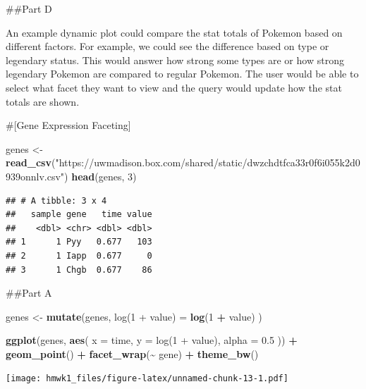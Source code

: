 \documentclass[
]{article}
\newenvironment{Shaded}{\begin{snugshade}}{\end{snugshade}}
\newcommand{\AttributeTok}[1]{\textcolor[rgb]{0.13,0.29,0.53}{#1}}
\newcommand{\DecValTok}[1]{\textcolor[rgb]{0.00,0.00,0.81}{#1}}
\newcommand{\FloatTok}[1]{\textcolor[rgb]{0.00,0.00,0.81}{#1}}
\newcommand{\FunctionTok}[1]{\textcolor[rgb]{0.13,0.29,0.53}{\textbf{#1}}}
\newcommand{\NormalTok}[1]{#1}
\newcommand{\OtherTok}[1]{\textcolor[rgb]{0.56,0.35,0.01}{#1}}
\newcommand{\SpecialCharTok}[1]{\textcolor[rgb]{0.81,0.36,0.00}{\textbf{#1}}}
\newcommand{\StringTok}[1]{\textcolor[rgb]{0.31,0.60,0.02}{#1}}
\begin{document}
\#\#Part D

An example dynamic plot could compare the stat totals of Pokemon based
on different factors. For example, we could see the difference based on
type or legendary status. This would answer how strong some types are or
how strong legendary Pokemon are compared to regular Pokemon. The user
would be able to select what facet they want to view and the query would
update how the stat totals are shown.

\#{[}Gene Expression Faceting{]}

\begin{Shaded}
\begin{Highlighting}[]
\NormalTok{genes }\OtherTok{\textless{}{-}} \FunctionTok{read\_csv}\NormalTok{(}\StringTok{"https://uwmadison.box.com/shared/static/dwzchdtfca33r0f6i055k2d0939onnlv.csv"}\NormalTok{)}
\FunctionTok{head}\NormalTok{(genes, }\DecValTok{3}\NormalTok{)}
\end{Highlighting}
\end{Shaded}

\begin{verbatim}
## # A tibble: 3 x 4
##   sample gene   time value
##    <dbl> <chr> <dbl> <dbl>
## 1      1 Pyy   0.677   103
## 2      1 Iapp  0.677     0
## 3      1 Chgb  0.677    86
\end{verbatim}

\#\#Part A

\begin{Shaded}
\begin{Highlighting}[]
\NormalTok{genes }\OtherTok{\textless{}{-}} \FunctionTok{mutate}\NormalTok{(genes,}
                \StringTok{\textquotesingle{}log(1 + value)\textquotesingle{}} \OtherTok{=} \FunctionTok{log}\NormalTok{(}\DecValTok{1} \SpecialCharTok{+}\NormalTok{ value)}
\NormalTok{                )}

\FunctionTok{ggplot}\NormalTok{(genes, }\FunctionTok{aes}\NormalTok{(}
  \AttributeTok{x =}\NormalTok{ time,}
  \AttributeTok{y =} \StringTok{\textasciigrave{}}\AttributeTok{log(1 + value)}\StringTok{\textasciigrave{}}\NormalTok{,}
  \AttributeTok{alpha =} \FloatTok{0.5}
\NormalTok{)) }\SpecialCharTok{+}
  \FunctionTok{geom\_point}\NormalTok{() }\SpecialCharTok{+}
  \FunctionTok{facet\_wrap}\NormalTok{(}\SpecialCharTok{\textasciitilde{}}\NormalTok{ gene) }\SpecialCharTok{+}
  \FunctionTok{theme\_bw}\NormalTok{()}
\end{Highlighting}
\end{Shaded}

\texttt{[image: hmwk1\_files/figure-latex/unnamed-chunk-13-1.pdf]}
\end{document}
